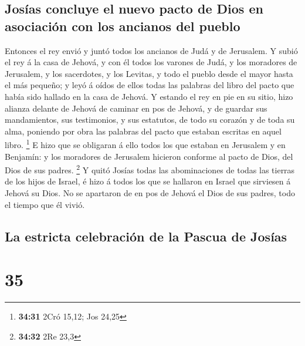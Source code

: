 \hypertarget{josuxedas-concluye-el-nuevo-pacto-de-dios-en-asociaciuxf3n-con-los-ancianos-del-pueblo}{%
\subsection{Josías concluye el nuevo pacto de Dios en asociación con los
ancianos del
pueblo}\label{josuxedas-concluye-el-nuevo-pacto-de-dios-en-asociaciuxf3n-con-los-ancianos-del-pueblo}}

 Entonces el rey envió y juntó todos los ancianos de Judá y
de Jerusalem.  Y subió el rey á la casa de Jehová, y con él
todos los varones de Judá, y los moradores de Jerusalem, y los
sacerdotes, y los Levitas, y todo el pueblo desde el mayor hasta el más
pequeño; y leyó á oídos de ellos todas las palabras del libro del pacto
que había sido hallado en la casa de Jehová.  Y estando el
rey en pie en su sitio, hizo alianza delante de Jehová de caminar en pos
de Jehová, y de guardar sus mandamientos, sus testimonios, y sus
estatutos, de todo su corazón y de toda su alma, poniendo por obra las
palabras del pacto que estaban escritas en aquel libro. \footnote{\textbf{34:31}
  2Cró 15,12; Jos 24,25}  E hizo que se obligaran á ello
todos los que estaban en Jerusalem y en Benjamín: y los moradores de
Jerusalem hicieron conforme al pacto de Dios, del Dios de sus padres.
\footnote{\textbf{34:32} 2Re 23,3}  Y quitó Josías todas
las abominaciones de todas las tierras de los hijos de Israel, é hizo á
todos los que se hallaron en Israel que sirviesen á Jehová su Dios. No
se apartaron de en pos de Jehová el Dios de sus padres, todo el tiempo
que él vivió.

\hypertarget{la-estricta-celebraciuxf3n-de-la-pascua-de-josuxedas}{%
\subsection{La estricta celebración de la Pascua de
Josías}\label{la-estricta-celebraciuxf3n-de-la-pascua-de-josuxedas}}

\hypertarget{section-34}{%
\section{35}\label{section-34}}

